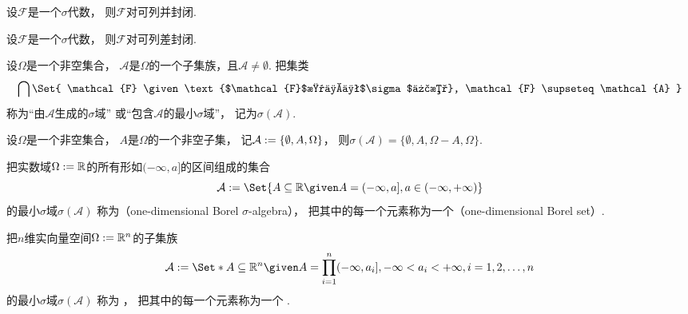 \begin{property}
设\(\mathcal{F}\)是一个\(\sigma\)代数，
则\(\mathcal{F}\)对可列并封闭.
\end{property}

\begin{property}
设\(\mathcal{F}\)是一个\(\sigma\)代数，
则\(\mathcal{F}\)对可列差封闭.
\end{property}

\begin{definition}
设\(\Omega\)是一个非空集合，
\(\mathcal{A}\)是\(\Omega\)的一个子集族，且\(\mathcal{A}\neq\emptyset\).
把集类\begin{equation*}
	\bigcap\Set{
		\mathcal{F}
		\given
		\text{$\mathcal{F}$是一个$\sigma$代数},
		\mathcal{F} \supseteq \mathcal{A}
	}
\end{equation*}
称为“由\(\mathcal{A}\)生成的\(\sigma\)域”
或“包含\(\mathcal{A}\)的最小\(\sigma\)域”，
记为\(\sigma(\mathcal{A})\).
\end{definition}

\begin{example}
设\(\Omega\)是一个非空集合，
\(A\)是\(\Omega\)的一个非空子集，
记\(\mathcal{A} := \{\emptyset,A,\Omega\}\)，
则\(\sigma(\mathcal{A}) = \{\emptyset,A,\Omega-A,\Omega\}\).
\end{example}

\begin{definition}
把实数域\(\Omega := \mathbb{R}\)的所有形如\((-\infty,a]\)的区间组成的集合\begin{equation*}
	\mathcal{A}
	\defeq
	\Set{
		A \subseteq \mathbb{R}
		\given
		A = (-\infty,a],
		a \in (-\infty,+\infty)
	}
\end{equation*}
的最小\(\sigma\)域\(\sigma(\mathcal{A})\)
称为（one-dimensional Borel \(\sigma\)-algebra），
把其中的每一个元素称为一个（one-dimensional Borel set）.
\end{definition}

\begin{definition}
把\(n\)维实向量空间\(\Omega := \mathbb{R}^n\)的子集族\begin{equation*}
	\mathcal{A}
	\defeq
	\Set*{
		A \subseteq \mathbb{R}^n
		\given
		A = \BigTimes_{i=1}^n (-\infty,a_i],
		-\infty < a_i < +\infty,
		i = 1,2,\dotsc,n
	}
\end{equation*}
的最小\(\sigma\)域\(\sigma(\mathcal{A})\)
称为 ，
把其中的每一个元素称为一个 .
\end{definition}

